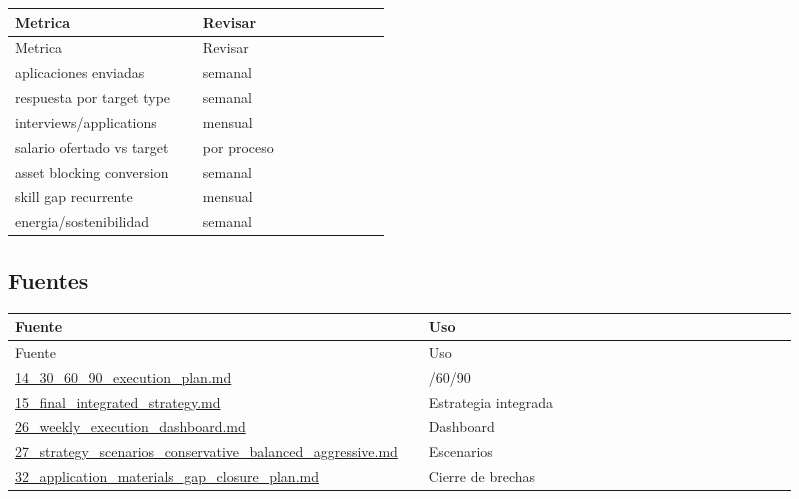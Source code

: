 \begin{center}
\scriptsize
\begin{longtable}{>{\raggedright\arraybackslash}p{0.455\linewidth} >{\raggedright\arraybackslash}p{0.455\linewidth}}
\toprule
Metrica & Revisar \\
\midrule
\endfirsthead
\toprule
Metrica & Revisar \\
\midrule
\endhead
aplicaciones enviadas & semanal \\
respuesta por target type & semanal \\
interviews/applications & mensual \\
salario ofertado vs target & por proceso \\
asset blocking conversion & semanal \\
skill gap recurrente & mensual \\
energia/sostenibilidad & semanal \\
\bottomrule
\end{longtable}
\end{center}


\subsection{Fuentes}


\begin{center}
\scriptsize
\begin{longtable}{>{\raggedright\arraybackslash}p{0.455\linewidth} >{\raggedright\arraybackslash}p{0.455\linewidth}}
\toprule
Fuente & Uso \\
\midrule
\endfirsthead
\toprule
Fuente & Uso \\
\midrule
\endhead
\href{file:///E:/Laboral/14_30_60_90_execution_plan.md}{14\_30\_60\_90\_execution\_plan.md} & 30/60/90 \\
\href{file:///E:/Laboral/15_final_integrated_strategy.md}{15\_final\_integrated\_strategy.md} & Estrategia integrada \\
\href{file:///E:/Laboral/26_weekly_execution_dashboard.md}{26\_weekly\_execution\_dashboard.md} & Dashboard \\
\href{file:///E:/Laboral/27_strategy_scenarios_conservative_balanced_aggressive.md}{27\_strategy\_scenarios\_conservative\_balanced\_aggressive.md} & Escenarios \\
\href{file:///E:/Laboral/32_application_materials_gap_closure_plan.md}{32\_application\_materials\_gap\_closure\_plan.md} & Cierre de brechas \\
\bottomrule
\end{longtable}
\end{center}
